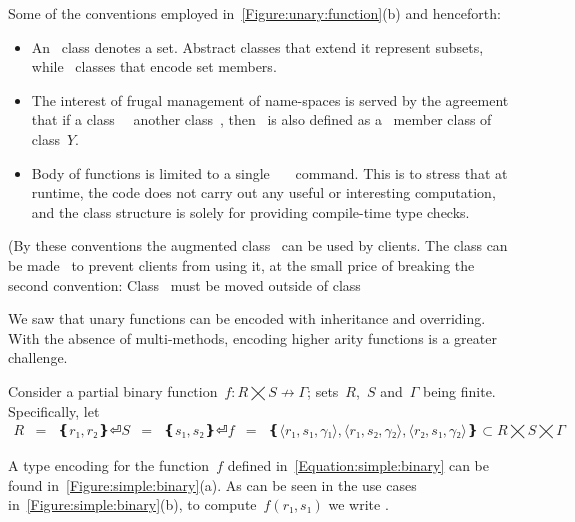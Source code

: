 Some of the conventions employed in~\cref{Figure:unary:function}(b) and henceforth:
\begin{itemize}
  \item An~ class denotes a set. Abstract classes that extend it represent
      subsets, while~ classes that encode set members.
  \item The interest of frugal management of name-spaces is served by the agreement that if
    a class~~ another class~, then~ is also defined
    as a~ member class of class~$Y$.
  \item Body of functions is limited to a single~~~\cc{;} command.
    This is to stress that at runtime, the code does not carry out any useful or interesting computation,
      and the class structure is solely for providing compile-time type checks.
\end{itemize}
(By these conventions the augmented class~ can be used by clients.
The class can be made~ to prevent clients from using it,
  at the small price of breaking the second convention:
  Class~ must be moved outside of class~

We saw that unary functions can be encoded with inheritance and overriding.
With the absence of multi-methods, encoding higher arity functions is a greater challenge.

Consider a partial binary function~$f: R⨉S↛Γ$; sets~$R$,~$S$ and~$Γ$ being finite.
Specifically, let
\begin{equation}
  \label{Equation:simple:binary}
  \begin{array}{rcl}
    R & = & ❴ r₁, r₂❵⏎
    S & = & ❴ s₁, s₂❵⏎
    f & = & ❴ ⟨r₁, s₁,γ₁⟩, ⟨r₁, s₂,γ₂⟩, ⟨r₂, s₁,γ₂⟩ ❵ ⊂ R⨉S⨉Γ
  \end{array}
\end{equation}

A \Java type encoding for the function~$f$ defined in~\cref{Equation:simple:binary}
  can be found in~\cref{Figure:simple:binary}(a).
As can be seen in the use cases in~\cref{Figure:simple:binary}(b),
  to compute~$f(r₁,s₁)$ we write .

